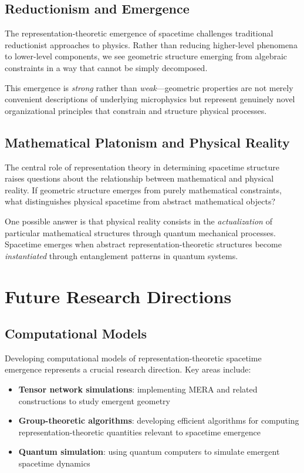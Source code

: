 \documentclass[12pt]{article}
\begin{document}
\subsection{Reductionism and Emergence}

The representation-theoretic emergence of spacetime challenges traditional reductionist approaches to physics. Rather than reducing higher-level phenomena to lower-level components, we see geometric structure emerging from algebraic constraints in a way that cannot be simply decomposed.

This emergence is \emph{strong} rather than \emph{weak}—geometric properties are not merely convenient descriptions of underlying microphysics but represent genuinely novel organizational principles that constrain and structure physical processes.

\subsection{Mathematical Platonism and Physical Reality}

The central role of representation theory in determining spacetime structure raises questions about the relationship between mathematical and physical reality. If geometric structure emerges from purely mathematical constraints, what distinguishes physical spacetime from abstract mathematical objects?

One possible answer is that physical reality consists in the \emph{actualization} of particular mathematical structures through quantum mechanical processes. Spacetime emerges when abstract representation-theoretic structures become \emph{instantiated} through entanglement patterns in quantum systems.

\section{Future Research Directions}

\subsection{Computational Models}

Developing computational models of representation-theoretic spacetime emergence represents a crucial research direction. Key areas include:

\begin{itemize}
\item \textbf{Tensor network simulations}: implementing MERA and related constructions to study emergent geometry
\item \textbf{Group-theoretic algorithms}: developing efficient algorithms for computing representation-theoretic quantities relevant to spacetime emergence
\item \textbf{Quantum simulation}: using quantum computers to simulate emergent spacetime dynamics
\end{itemize}
\end{document}

